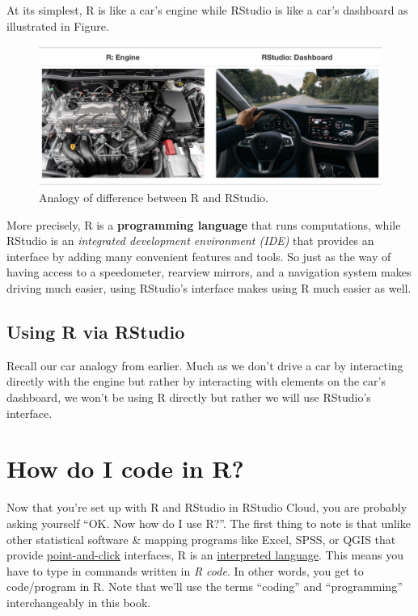 \documentclass[]{book}
\begin{document}
At its simplest, R is like a car's engine while RStudio is like a car's dashboard as illustrated in Figure.

\begin{figure}

{\centering \includegraphics[width=0.95\linewidth]{images/shutterstock/R_vs_RStudio_1} 

}

\caption{Analogy of difference between R and RStudio.}\label{fig:R-vs-RStudio-1}
\end{figure}

More precisely, R is a \textbf{programming language} that runs computations, while RStudio is an \emph{integrated development environment (IDE)} that provides an interface by adding many convenient features and tools. So just as the way of having access to a speedometer, rearview mirrors, and a navigation system makes driving much easier, using RStudio's interface makes using R much easier as well.

\hypertarget{using-r-via-rstudio}{%
\subsection{Using R via RStudio}\label{using-r-via-rstudio}}

Recall our car analogy from earlier. Much as we don't drive a car by interacting directly with the engine but rather by interacting with elements on the car's dashboard, we won't be using R directly but rather we will use RStudio's interface.

\hypertarget{code}{%
\section{How do I code in R?}\label{code}}

Now that you're set up with R and RStudio in RStudio Cloud, you are probably asking yourself ``OK. Now how do I use R?''. The first thing to note is that unlike other statistical software \& mapping programs like Excel, SPSS, or QGIS that provide \href{https://en.wikipedia.org/wiki/Point_and_click}{point-and-click} interfaces, R is an \href{https://en.wikipedia.org/wiki/Interpreted_language}{interpreted language}. This means you have to type in commands written in \emph{R code}. In other words, you get to code/program in R. Note that we'll use the terms ``coding'' and ``programming'' interchangeably in this book.
\end{document}
